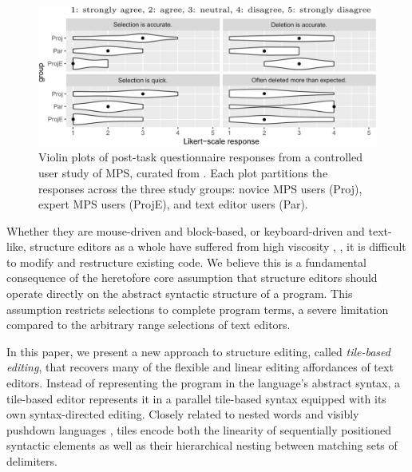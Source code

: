 \begin{figure}[b]
  \centering
  \includegraphics[width=\columnwidth]{img/mps-violin-plots.png}
  \caption{Violin plots of post-task questionnaire responses
  from a controlled user study of MPS, curated from \cite{ProjEfficiency}.
  Each plot partitions the responses across the three study groups:
  novice MPS users (Proj), expert MPS users (ProjE),
  and text editor users (Par).
  }
  \label{fig:mps-violin-plots}
\end{figure}

Whether they are mouse-driven and block-based,
or keyboard-driven and text-like,
structure editors as a whole have suffered
from high viscosity \cite{cog-dim},
\ie, it is difficult to modify
and restructure existing code.
We believe this is a fundamental consequence
of the heretofore core assumption that structure editors
should operate directly on the abstract syntactic structure
of a program.
This assumption restricts selections to complete
program terms, a severe limitation compared to
the arbitrary range selections of text editors.

In this paper, we present a new approach to structure
editing, called \emph{tile-based editing}, that
recovers many of the flexible and linear editing
affordances of text editors.
Instead of representing the program in the language's
abstract syntax, a tile-based editor represents it
in a parallel tile-based syntax equipped with its own
syntax-directed editing.
Closely related to nested words \cite{nested-words}
and visibly pushdown languages \cite{visibly-pushdown-langs},
tiles encode both the linearity of sequentially
positioned syntactic elements as well as
their hierarchical nesting between matching sets
of delimiters.



